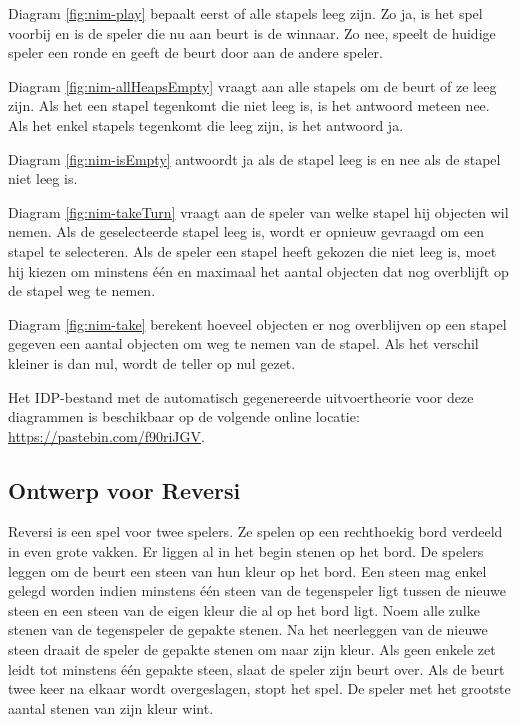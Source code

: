 Diagram \ref{fig:nim-play} bepaalt eerst of alle stapels leeg zijn. Zo ja, is het spel voorbij en is de speler die nu aan beurt is de winnaar. Zo nee, speelt de huidige speler een ronde en geeft de beurt door aan de andere speler.

Diagram \ref{fig:nim-allHeapsEmpty} vraagt aan alle stapels om de beurt of ze leeg zijn. Als het een stapel tegenkomt die niet leeg is, is het antwoord meteen nee. Als het enkel stapels tegenkomt die leeg zijn, is het antwoord ja.

Diagram \ref{fig:nim-isEmpty} antwoordt ja als de stapel leeg is en nee als de stapel niet leeg is.

Diagram \ref{fig:nim-takeTurn} vraagt aan de speler van welke stapel hij objecten wil nemen. Als de geselecteerde stapel leeg is, wordt er opnieuw gevraagd om een stapel te selecteren. Als de speler een stapel heeft gekozen die niet leeg is, moet hij kiezen om minstens \'e\'en en maximaal het aantal objecten dat nog overblijft op de stapel weg te nemen.

Diagram \ref{fig:nim-take} berekent hoeveel objecten er nog overblijven op een stapel gegeven een aantal objecten om weg te nemen van de stapel. Als het verschil kleiner is dan nul, wordt de teller op nul gezet.

Het IDP-bestand met de automatisch gegenereerde uitvoertheorie voor deze diagrammen is beschikbaar op de volgende online locatie: \url{https://pastebin.com/f90riJGV}.


\subsection{Ontwerp voor Reversi}\label{sec:reversi-design}

Reversi is een spel voor twee spelers. Ze spelen op een rechthoekig bord verdeeld in even grote vakken. Er liggen al in het begin stenen op het bord. De spelers leggen om de beurt een steen van hun kleur op het bord. Een steen mag enkel gelegd worden indien minstens \'e\'en steen van de tegenspeler ligt tussen de nieuwe steen en een steen van de eigen kleur die al op het bord ligt. Noem alle zulke stenen van de tegenspeler de gepakte stenen. Na het neerleggen van de nieuwe steen draait de speler de gepakte stenen om naar zijn kleur. Als geen enkele zet leidt tot minstens \'e\'en gepakte steen, slaat de speler zijn beurt over. Als de beurt twee keer na elkaar wordt overgeslagen, stopt het spel. De speler met het grootste aantal stenen van zijn kleur wint.

